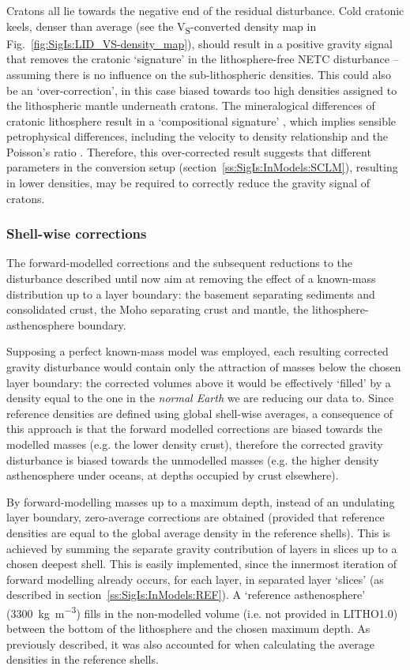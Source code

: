Cratons all lie towards the negative end of the residual disturbance.
Cold cratonic keels, denser than average (see the V\textsubscript{S}-converted density map in Fig.~\ref{fig:SigIs:LID_VS-density_map}), should result in a positive gravity signal that removes the cratonic `signature' in the lithosphere-free NETC disturbance -- assuming there is no influence on the sub-lithospheric densities.
This could also be an `over-correction', in this case biased towards too high densities assigned to the lithospheric mantle underneath cratons.
The mineralogical differences of cratonic lithosphere result in a `compositional signature' \parencite[see e.g.][]{Simmons2010}, which implies sensible petrophysical differences, including the velocity to density relationship and the Poisson's ratio \parencite{Guerri2015}.
Therefore, this over-corrected result suggests that different parameters in the conversion setup (section~\ref{ss:SigIs:InModels:SCLM}), resulting in lower densities, may be required to correctly reduce the gravity signal of cratons.

\subsubsection{Shell-wise corrections}
\label{sss:SigIs:Results:Maps:Shellwise}
The forward-modelled corrections and the subsequent reductions to the disturbance described until now aim at removing the effect of a known-mass distribution up to a layer boundary: the basement separating sediments and consolidated crust, the Moho separating crust and mantle, the lithosphere-asthenosphere boundary.

Supposing a perfect known-mass model was employed, each resulting corrected gravity disturbance would contain only the attraction of masses below the chosen layer boundary: the corrected volumes above it would be effectively `filled' by a density equal to the one in the \textit{normal Earth} we are reducing our data to.
Since reference densities are defined using global shell-wise averages, a consequence of this approach is that the forward modelled corrections are biased towards the modelled masses (e.g. the lower density crust), therefore the corrected gravity disturbance is biased towards the unmodelled masses (e.g. the higher density asthenosphere under oceans, at depths occupied by crust elsewhere).

By forward-modelling masses up to a maximum depth, instead of an undulating layer boundary, zero-average corrections are obtained (provided that reference densities are equal to the global average density in the reference shells).
This is achieved by summing the separate gravity contribution of layers in slices up to a chosen deepest shell.
This is easily implemented, since the innermost iteration of forward modelling already occurs, for each layer, in separated layer `slices' (as described in section~\ref{ss:SigIs:InModels:REF}).
A `reference asthenosphere' (\SI{3300}{\kilo \gram \per \cubic \metre}) fills in the non-modelled volume (i.e. not provided in {LITHO1.0}) between the bottom of the lithosphere and the chosen maximum depth.
As previously described, it was also accounted for when calculating the average densities in the reference shells.

